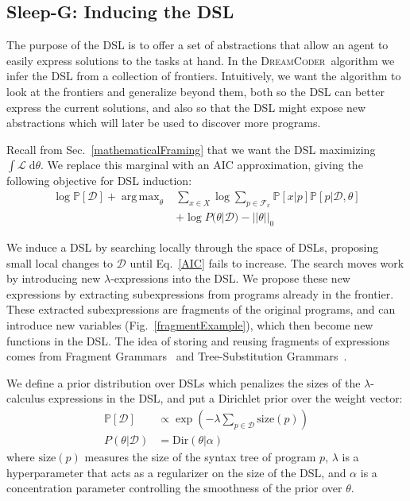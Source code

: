 \documentclass{article}
\newcommand{\system}{\textsc{DreamCoder}~}
\newcommand{\lowerBound}{\mathscr{L}}
\DeclareMathOperator*{\argmax}{arg\,max} %
\newcommand{\probability}{\mathds{P}} %
\begin{document}
\subsection{Sleep-G: Inducing the DSL}\label{grammarInductionSection}

The purpose of the DSL is to
offer a set of abstractions
that allow an agent to easily express solutions to the tasks at hand.
In the \system algorithm we infer the DSL from a collection of frontiers.
Intuitively, we want the algorithm to
look at  the frontiers and
generalize beyond them, 
both so the DSL can better express the current solutions,
and  also so that the DSL might expose new abstractions
which will later be used to
discover more programs.

Recall from Sec.~\ref{mathematicalFraming} that we want the DSL maximizing $\int \lowerBound\;\mathrm{d}\theta$.
We replace this marginal with an AIC approximation, giving the following objective for DSL induction:
\begin{align}
\nonumber  \log \probability[\mathcal{D}] + \argmax_{\theta}& \sum_{x\in X}\log \sum_{p\in \mathcal{F}_x}\probability[x|p]\probability[p|\mathcal{D},\theta]\\
&+  \log P(\theta|\mathcal{D}) - ||\theta||_0 \label{AIC}
  \end{align}

We induce a DSL by searching locally through the space of DSLs,
proposing small local changes to $\mathcal{D}$ until Eq.~\ref{AIC} fails to increase.
The search moves work by introducing new
$\lambda$-expressions into the DSL.
We propose these new expressions by extracting subexpressions from
programs already in the frontier.
These extracted subexpressions
are fragments of the original programs, and can introduce new variables (Fig.~\ref{fragmentExample}),
which then become new functions in the DSL.
The idea of storing and reusing
fragments of expressions comes from Fragment Grammars~\cite{tim} and Tree-Substitution Grammars~\cite{cohn2010inducing}.



We define a prior distribution over DSLs which penalizes the sizes of the $\lambda$-calculus expressions in the DSL, and put a Dirichlet prior over the weight vector:
\begin{align*}
  \probability[\mathcal{D}]&\propto\exp\left(-\lambda\sum_{p\in \mathcal{D}}\text{size}(p) \right)\\
  P(\theta|\mathcal{D})& = \text{Dir}(\theta|\alpha)
\end{align*}
where $\text{size}(p)$  measures the size of the syntax tree of program $p$,
$\lambda$ is a hyperparameter that acts as a regularizer on the size of the DSL,
and $\alpha$ is a concentration parameter controlling the smoothness of the prior over $\theta$.
\end{document}
